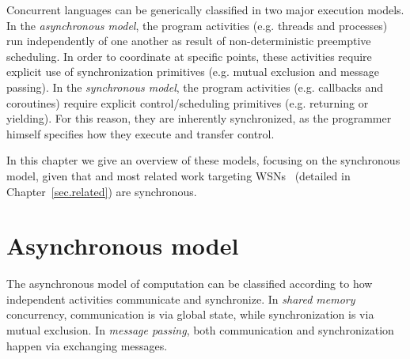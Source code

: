 %

Concurrent languages can be generically classified in two major execution 
models.
%
In the \emph{asynchronous model}, the program activities (e.g. threads and 
processes) run independently of one another as result of non-deterministic 
preemptive scheduling.
In order to coordinate at specific points, these activities require explicit 
use of synchronization primitives (e.g. mutual exclusion and message passing).
%
In the \emph{synchronous model}, the program activities (e.g.  callbacks and 
coroutines) require explicit control/scheduling primitives (e.g. returning or 
yielding).
For this reason, they are inherently synchronized, as the programmer himself 
specifies how they execute and transfer control.

In this chapter we give an overview of these models, focusing on the 
synchronous model, given that \CEU and most related work targeting 
WSNs~\cite{wsn.nesc,wsn.protothreads,wsn.osm,wsn.tinythreads,wsn.sol,wsn.flowtalk,wsn.ocram} 
(detailed in Chapter~\ref{sec.related}) are synchronous.

\section{Asynchronous model}

The asynchronous model of computation can be classified according to how 
independent activities communicate and synchronize.
In \emph{shared memory} concurrency, communication is via global state, while 
synchronization is via mutual exclusion.
In \emph{message passing}, both communication and synchronization happen via 
exchanging messages.

